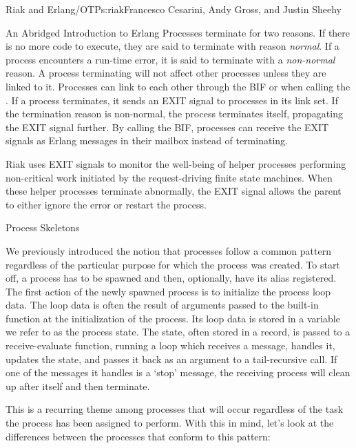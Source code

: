 \begin{aosachapter}{Riak and Erlang/OTP}{s:riak}{Francesco Cesarini, Andy Gross, and Justin Sheehy}
\begin{aosasect1}{An Abridged Introduction to Erlang}
Processes terminate for two reasons. If there is no more code to
execute, they are said to terminate with reason \emph{normal}. If a
process encounters a run-time error, it is said to terminate with a
\emph{non-normal} reason. A process terminating will not affect other
processes unless they are linked to it. Processes can link to each
other through the  BIF or when calling the
. If a process
terminates, it sends an EXIT signal to processes in its link set. If
the termination reason is non-normal, the process terminates itself,
propagating the EXIT signal further. By calling the
 BIF, processes can receive the
EXIT signals as Erlang messages in their mailbox instead of
terminating.

Riak uses EXIT signals to monitor the well-being of helper processes
performing non-critical work initiated by the request-driving finite
state machines. When these helper processes terminate abnormally, the
EXIT signal allows the parent to either ignore the error or restart
the process.

\end{aosasect1}

\begin{aosasect1}{Process Skeletons}

We previously introduced the notion that processes follow a common
pattern regardless of the particular purpose for which the process was
created. To start off, a process has to be spawned and then,
optionally, have its alias registered. The first action of the newly
spawned process is to initialize the process loop data. The loop data
is often the result of arguments passed to the  built-in
function at the initialization of the process. Its loop data is stored
in a variable we refer to as the process state. The state, often
stored in a record, is passed to a receive-evaluate function, running
a loop which receives a message, handles it, updates the state, and
passes it back as an argument to a tail-recursive call. If one of the
messages it handles is a `stop' message, the receiving process will
clean up after itself and then terminate.

This is a recurring theme among processes that will occur regardless
of the task the process has been assigned to perform. With this in
mind, let's look at the differences between the processes that conform
to this pattern:

\begin{aosaitemize}


\end{aosaitemize}
\end{aosasect1}
\end{aosachapter}
